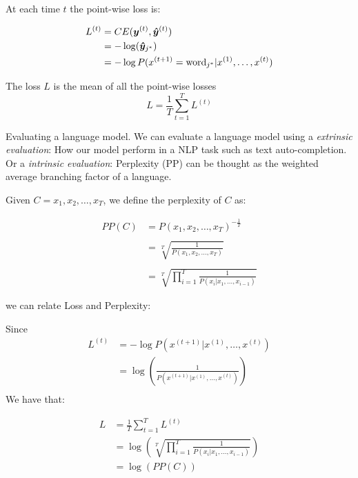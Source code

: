 At each time $t$ the point-wise loss is:

\vspace{0.2cm}

\begin{align}
L^{(t)} &= CE(\bm{y}^{(t)},\bm{\hat{y}}^{(t)})\\
    &= - \log(\bm{\hat{y}}_{j^{*}})\\
        &= - \log P(x^{(t+1)} = \text{word}_{j^{*}}|x^{(1)}, \dots, x^{(t)})
\end{align}

The loss $L$ is the mean of all the point-wise losses
\begin{equation}
L=\frac{1}{T}\sum_{t=1}^{T}L^{(t)}
\end{equation}


Evaluating a language model. We can evaluate a  language model using a \textit{extrinsic evaluation}: How our model perform in a NLP task such as text auto-completion. Or a \textit{intrinsic evaluation}: Perplexity (PP) can be thought as the weighted average branching factor of a language.


Given $C= x_1, x_2, \dots, x_T$, we define the perplexity of $C$ as:

\begin{align}
PP(C) &= P(x_1, x_2, \dots, x_T)^{-\frac{1}{T}}\\
    & \\
      &= \sqrt[T]{\frac{1}{P(x_1, x_2, \dots, x_T)}}\\
      & \\
      &= \sqrt[T]{\prod_{i=1}^{T}\frac{1}{P(x_i \vert x_1,\dots, x_{i-1})}}
\end{align}

we can relate Loss and Perplexity:

Since
\begin{align}
L^{(t)} & = - \log P(x^{(t+1)} |x^{(1)}, \dots, x^{(t)})\\
& =  \log(\frac{1}{P(x^{(t+1)}|x^{(1)}, \dots, x^{(t)})})\\
\end{align}
We have that:

\begin{align}
        L &=\frac{1}{T} \sum_{t=1}^{T} L^{(t)}\\
          &= \log\left( \sqrt[T]{\prod_{i=1}^{T}\frac{1}{P(x_i \vert x_1,\dots, x_{i-1})}} \right)\\
          &= \log(PP(C))
\end{align}

